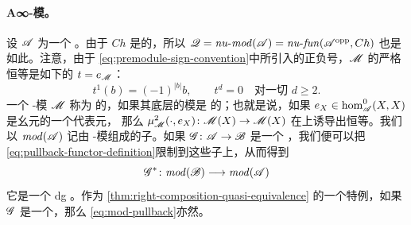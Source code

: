 \paragraph{A∞-模。}\label{sub:cunital-a-infinity-modules}
设 $\mathscr{A}$ 为一个 \trCunital{} \trACategory。由于 $Ch$ 是\trStrictlyUnital{}的，所以
$\mathscr{Q}=\mathit{nu}\text{-}\mathit{mod}(\mathscr{A})
=\mathit{nu}\text{-}\mathit{fun}(\mathscr{A}^{\mathrm{opp}},Ch)$ 也是如此。注意，由于
\eqref{eq:premodule-sign-convention}中所引入的正负号，$\mathscr{M}$ 的严格恒等是如下的%
\trModule\trHomomorphism{} $t=e_{\mathscr{M}}$：
\begin{equation}\label{eq:strict-identity-module}
t^1(b)=(-1)^{|b|}b,\qquad t^d=0\quad\text{对一切 }d\ge 2.
\end{equation}
一个 \trAinfty-模 $\mathscr{M}$ 称为 \trCunital{}的，如果其底层的\trCohomology{}模是%
\trUnital{}的；也就是说，如果 $e_X\in\hom^0_{\mathscr{A}}(X,X)$
是\trCohomology{}幺元的一个代表元，
那么\trChainMap{} $\mu^2_{\mathscr{M}}(\cdot,e_X)\colon\mathscr{M}(X)\to\mathscr{M}(X)$
在\trCohomology{}上诱导出恒等。我们以 $\mathit{mod}(\mathscr{A})$ 记由 \trCunital{}
\trAinfty-模组成的\trFull{}子\trCategory。如果 $\mathscr{G}\colon\mathscr{A}\to\mathscr{B}$
是一个 \trCunital{} \trAFunctor，我们便可以把\trPullback{}
\eqref{eq:pullback-functor-definition}限制到这些子\trCategory{}上，从而得到
\begin{equation}\label{eq:mod-pullback}
\mathscr{G}^*\colon\mathit{mod}(\mathscr{B})\longrightarrow\mathit{mod}(\mathscr{A})
\end{equation}
它是一个\trStrictlyUnital{} dg \trFunctor。作为%
\cref{thm:right-composition-quasi-equivalence}
的一个特例，如果 $\mathscr{G}$ 是一个\trQuasiequivalence，那么
\eqref{eq:mod-pullback}亦然。
